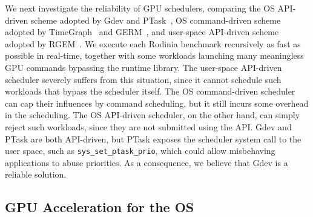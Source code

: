 We next investigate the reliability of GPU schedulers, comparing the OS
API-driven scheme adopted by Gdev and PTask~\cite{Rossbach_SOSP11}, OS
command-driven scheme adopted by TimeGraph~\cite{Kato_ATC11} and
GERM~\cite{Bautin_MCNC08}, and user-space API-driven scheme adopted by
RGEM~\cite{Kato_RTSS11}.
We execute each Rodinia benchmark recursively as fast as possible in
real-time, together with some workloads launching many meaningless GPU
commands bypassing the runtime library. 
The user-space API-driven scheduler severely suffers from this
situation, since it cannot schedule such workloads that bypass the
scheduler itself.
The OS command-driven scheduler can cap their influences by command
scheduling, but it still incurs some overhead in the scheduling.
The OS API-driven scheduler, on the other hand, can simply reject such
workloads, since they are not submitted using the API.
Gdev and PTask are both API-driven, but PTask exposes the scheduler
system call to the user space, such as \texttt{sys\_set\_ptask\_prio},
which could allow misbehaving applications to abuse priorities.
As a consequence, we believe that Gdev is a reliable solution.

\subsection{GPU Acceleration for the OS}

